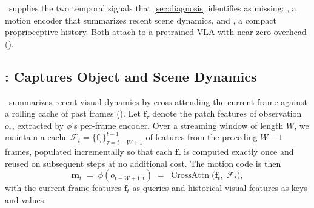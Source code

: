 \ours\ supplies the two temporal signals that \cref{sec:diagnosis} identifies as missing: \TEMPOMOT, a motion encoder that summarizes recent scene dynamics, and \TEMPOACT, a compact proprioceptive history. Both attach to a pretrained VLA with near-zero overhead ().

\vspace{-0.3em}
\subsection{\TEMPOMOT: Captures Object and Scene Dynamics}
\TEMPOMOT\ summarizes recent visual dynamics by cross-attending the current frame against a rolling cache of past frames (). Let $\mathbf{f}_\tau$ denote the patch features of observation $o_\tau$, extracted by $\phi$'s per-frame encoder. Over a streaming window of length $W$, we maintain a cache $\mathcal{F}_t = \{\mathbf{f}_\tau\}_{\tau=t-W+1}^{t-1}$ of features from the preceding $W-1$ frames, populated incrementally so that each $\mathbf{f}_\tau$ is computed exactly once and reused on subsequent steps at no additional cost. The motion code is then
\begin{equation}
\label{eq:tempomot}
\mathbf{m}_t \;=\; \phi(o_{t-W+1:t}) \;=\; \operatorname{CrossAttn}\bigl(\mathbf{f}_t,\; \mathcal{F}_t\bigr),
\end{equation}
with the current-frame features $\mathbf{f}_t$ as queries and historical visual features as keys and values.

